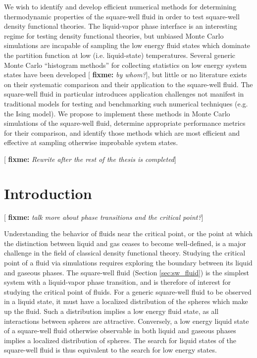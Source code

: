 \documentclass[11pt]{article}
\newcommand{\red}[1]{{\bf \color{red} #1}}
\newcommand{\fixme}[1]{[\red{fixme:} \emph{#1}]}
\begin{document}
\thispagestyle{abstract}

We wish to identify and develop efficient numerical methods for
determining thermodynamic properties of the square-well fluid in order
to test square-well density functional theories. The liquid-vapor
phase interface is an interesting regime for testing density
functional theories, but unbiased Monte Carlo simulations are
incapable of sampling the low energy fluid states which dominate the
partition function at low (i.e. liquid-state) temperatures. Several
generic Monte Carlo ``histogram methods'' for collecting statistics on
low energy system states have been developed \fixme{by whom?}, but
little or no literature exists on their systematic comparison and
their application to the square-well fluid. The square-well fluid in
particular introduces application challenges not manifest in
traditional models for testing and benchmarking such numerical
techniques (e.g. the Ising model). We propose to implement these
methods in Monte Carlo simulations of the square-well fluid, determine
appropriate performance metrics for their comparison, and identify
those methods which are most efficient and effective at sampling
otherwise improbable system states.

\fixme{Rewrite after the rest of the thesis is completed}

\newpage


\section{Introduction}
\label{sec:intro}

\fixme{talk more about phase transitions and the critical point?}

Understanding the behavior of fluids near the critical point, or the
point at which the distinction between liquid and gas ceases to become
well-defined, is a major challenge in the field of classical density
functional theory. Studying the critical point of a fluid via
simulations requires exploring the boundary between its liquid and
gaseous phases. The square-well fluid (Section \ref{sec:sw_fluid}) is
the simplest system with a liquid-vapor phase transition, and is
therefore of interest for studying the critical point of fluids. For a
generic square-well fluid to be observed in a liquid state, it must
have a localized distribution of the spheres which make up the
fluid. Such a distribution implies a low energy fluid state, as all
interactions between spheres are attractive. Conversely, a low energy
liquid state of a square-well fluid otherwise observable in both
liquid and gaseous phases implies a localized distribution of
spheres. The search for liquid states of the square-well fluid is thus
equivalent to the search for low energy states.
\end{document}
